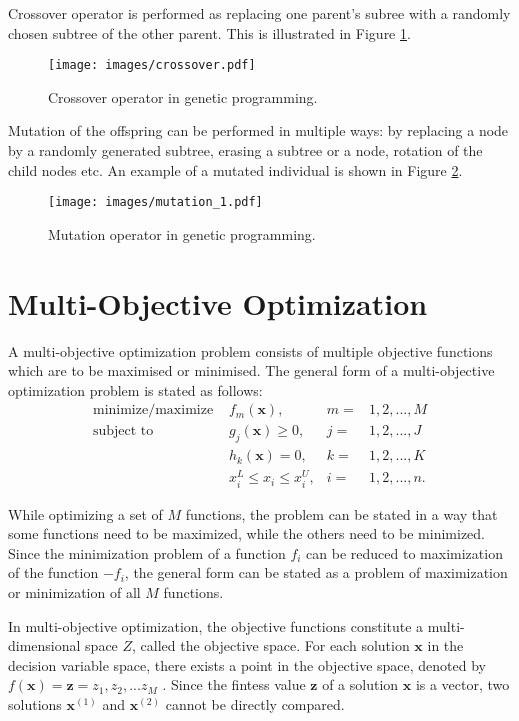 Crossover operator is performed as replacing one parent's subree with a randomly chosen subtree of the other parent.
This is illustrated in Figure \ref{genprog:ex2}.
\begin{figure}[ht]
    \centering
    \texttt{[image: images/crossover.pdf]}
    \caption{Crossover operator in genetic programming.}
    \label{genprog:ex2}
\end{figure}

Mutation of the offspring can be performed in multiple ways: by replacing a node by a randomly generated subtree, erasing a subtree or a node, rotation of the child nodes etc.
An example of a mutated individual is shown in Figure \ref{genprog:ex3}.
\begin{figure}[H]
    \centering
    \texttt{[image: images/mutation\_1.pdf]}
    \caption{Mutation operator in genetic programming.}
    \label{genprog:ex3}
\end{figure}

\newpage
\section{Multi-Objective Optimization}
A multi-objective optimization problem consists of multiple objective functions which are to be maximised or minimised. 
The general form of a multi-objective optimization problem is stated as follows:
\begin{align*}
\text{minimize/maximize } & f_m(\textbf{x}),  & m = & 1, 2, ..., M \\
\text{subject to } & g_j(\textbf{x}) \geq 0, & j = & 1, 2, ..., J \\
           & h_k(\textbf{x}) = 0, & k = & 1, 2, ..., K \\
           & x_{i}^{L} \leq x_i \leq x_{i}^{U}, & i = & 1, 2, ..., n. 
\end{align*}

While optimizing a set of $M$ functions, the problem can be stated in a way that some functions need to be maximized, while the others need to be minimized. 
Since the minimization problem of a function $f_i$ can be reduced to maximization of the function $-f_i$, the general form can be stated as a problem of maximization or minimization of all $M$ functions.

In multi-objective optimization, the objective functions constitute a multi-dimensional space $Z$, called the objective space. 
For each solution $\textbf{x}$ in the decision variable space, there exists a point in the objective space, denoted by $f(\textbf{x}) = \textbf{z} = {z_1, z_2, ... z_M}$ 
\cite{deb2001multi}. 
Since the fintess value $\textbf{z}$ of a solution $\textbf{x}$ is a vector, two solutions 
$\textbf{x}^{(1)}$ and $\textbf{x}^{(2)}$ cannot be directly compared. 

